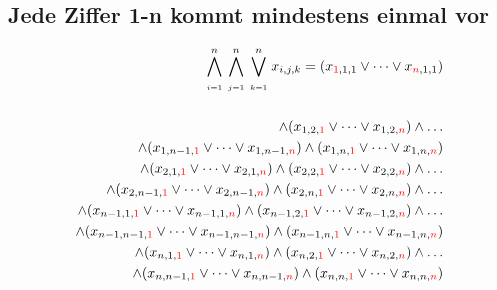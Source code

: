 \documentclass[11pt, a4paper]{article}
\begin{document}
	\subsection{Jede Ziffer 1-n kommt mindestens einmal vor}
	\begin{align*}
	\bigwedge_{\atop i=1}^n \bigwedge_{\atop j=1}^n \bigvee_{\atop k=1}^n
	x_{i,j,k} = (x_{{\color{red} 1},1,1} \vee \dots \vee x_{{\color{red} n},1,1})
	\\
	\\
	\wedge (x_{1,2,{\color{red} 1}} \vee \dots \vee x_{1,2,{\color{red} n}})
	\wedge \dots \\
	\wedge (x_{1,n-1,{\color{red} 1}} \vee \dots \vee x_{1,n-1,{\color{red} n}})
	\wedge (x_{1,n,{\color{red} 1}} \vee \dots \vee x_{1,n,{\color{red} n}}) \\
	\wedge (x_{2,1,{\color{red} 1}} \vee \dots \vee x_{2,1,{\color{red} n}})
	\wedge (x_{2,2,{\color{red} 1}} \vee \dots \vee x_{2,2,{\color{red} n}})
	\wedge \dots \\
	\wedge (x_{2,n-1,{\color{red} 1}} \vee \dots \vee x_{2,n-1,{\color{red} n}})
	\wedge (x_{2,n,{\color{red} 1}} \vee \dots \vee x_{2,n,{\color{red} n}})
	\wedge \dots \\
	\wedge (x_{n-1,1,{\color{red} 1}} \vee \dots \vee x_{n-1,1,{\color{red} n}}) 
	\wedge (x_{n-1,2,{\color{red} 1}} \vee \dots \vee x_{n-1,2,{\color{red} n}})
	\wedge \dots \\
	\wedge (x_{n-1,n-1,{\color{red} 1}} \vee \dots \vee x_{n-1,n-1,{\color{red} n}})
	\wedge (x_{n-1,n,{\color{red} 1}} \vee \dots \vee x_{n-1,n,{\color{red} n}}) \\
	\wedge (x_{n,1,{\color{red} 1}} \vee \dots \vee x_{n,1,{\color{red} n}}) 
	\wedge (x_{n,2,{\color{red} 1}} \vee \dots \vee x_{n,2,{\color{red} n}})
	\wedge \dots \\
	\wedge (x_{n,n-1,{\color{red} 1}} \vee \dots \vee x_{n,n-1,{\color{red} n}})
	\wedge (x_{n,n,{\color{red} 1}} \vee \dots \vee x_{n,n,{\color{red} n}})
	\end{align*}
	
	
%	
%	
%	
%	
	
\end{document}
